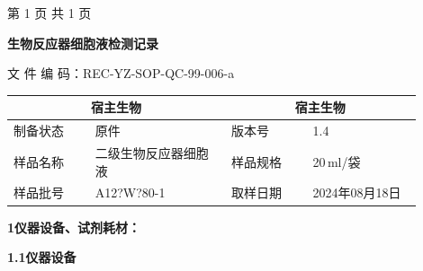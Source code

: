 \documentclass[UTF8,10pt,a4paper,fontset=fandol]{ctexart}
\newcommand{\fieldvalue}[1]{#1}
\newcommand{\handwritten}[1]{#1}
\begin{document}
\begin{center}
第 1 页 共 1 页
\end{center}

\newpage

\begin{center}
\textbf{生物反应器细胞液检测记录}
\end{center}

\noindent
文 件 编 码：REC-YZ-SOP-QC-99-006-a

\begin{center}
\begin{tabular}{|p{0.18\linewidth}|p{0.30\linewidth}|p{0.18\linewidth}|p{0.24\linewidth}|}
\hline
\multicolumn{2}{c|}{宿主生物} & \multicolumn{2}{c|}{宿主生物}\\
\hline
制备状态 &
\fieldvalue{原件}
& 版本号 & 1.4\\
\hline
样品名称 &
\fieldvalue{二级生物反应器细胞液}
& 样品规格 &
\fieldvalue{20}\,ml/袋\\
\hline
样品批号 &
\fieldvalue{\handwritten{A12?W?80-1}}
& 取样日期 &
\fieldvalue{\handwritten{2024年08月18日}}\\
\hline
\end{tabular}
\end{center}

\noindent\textbf{1\quad 仪器设备、试剂耗材：}

\noindent\textbf{1.1\quad 仪器设备}
\end{document}
